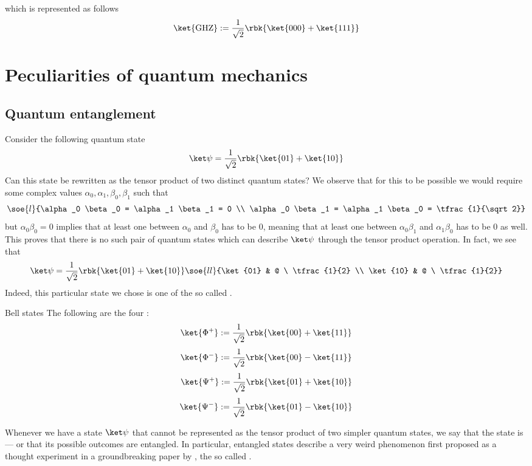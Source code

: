 \documentclass[a4paper, 12pt]{report}
\begin{document}
which is represented as follows $$\ket{\mbox{GHZ}} := \dfrac{1}{\sqrt 2}\rbk{\ket{000} + \ket{111}}$$

\section{Peculiarities of quantum mechanics}

\subsection{Quantum entanglement}

Consider the following quantum state $$\ket \psi = \dfrac{1}{\sqrt 2}\rbk{\ket {01} + \ket {10}}$$ Can this state be rewritten as the tensor product of two distinct quantum states? We observe that for this to be possible we would require some complex values $\alpha_0, \alpha_1, \beta_0, \beta_1$ such that $$\soe{l}{\alpha_0 \beta_0 = \alpha_1 \beta_1 = 0 \\ \alpha_0 \beta_1 = \alpha_1 \beta_0 = \tfrac{1}{\sqrt 2}}$$ but $\alpha_0 \beta_0 = 0$ implies that at least one between $\alpha_0$ and $\beta_0$ has to be 0, meaning that at least one between $\alpha_0\beta_1$ and $\alpha_1\beta_0$ has to be 0 as well. This proves that there is no such pair of quantum states which can describe $\ket \psi$ through the tensor product operation. In fact, we see that $$\ket \psi = \dfrac{1}{\sqrt 2}\rbk{\ket{01} + \ket{10}}  \soe{ll}{\ket{01} & @ \ \tfrac{1}{2} \\ \ket{10} & @ \ \tfrac{1}{2}}$$ Indeed, this particular state we chose is one of the so called .

\begin{frameddefn}{Bell states}
	The following are the four : $$\ket{\Phi^+} := \dfrac{1}{\sqrt 2}\rbk{\ket{00} + \ket{11}}$$ $$\ket{\Phi^-} := \dfrac{1}{\sqrt 2}\rbk{\ket{00} - \ket{11}}$$ $$\ket{\Psi^+} := \dfrac{1}{\sqrt 2}\rbk{\ket{01} + \ket{10}}$$ $$\ket{\Psi^-} := \dfrac{1}{\sqrt 2}\rbk{\ket{01} - \ket{10}}$$
\end{frameddefn}

Whenever we have a state $\ket \psi$ that cannot be represented as the tensor product of two simpler quantum states, we say that the state is  --- or that its possible outcomes are entangled. In particular, entangled states describe a very weird phenomenon first proposed as a thought experiment in a groundbreaking paper by  \cite{epr}, the so called .
\end{document}
